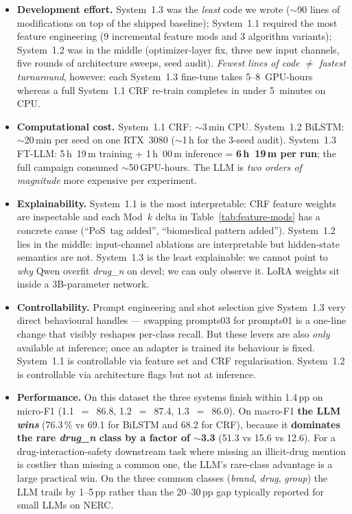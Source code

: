 \documentclass[a4paper,12pt]{article}
\begin{document}
\begin{itemize}[nosep]
    \item \textbf{Development effort.} System~1.3 was the \emph{least}
    code we wrote ($\sim$90 lines of modifications on top of the
    shipped baseline); System~1.1 required the most feature
    engineering (9 incremental feature mods and 3 algorithm
    variants); System~1.2 was in the middle (optimizer-layer fix,
    three new input channels, five rounds of architecture sweeps,
    seed audit). \emph{Fewest lines of code $\neq$ fastest turnaround},
    however: each System~1.3 fine-tune takes 5--8~GPU-hours whereas a
    full System~1.1 CRF re-train completes in under 5~minutes on
    CPU.
    \item \textbf{Computational cost.} System~1.1 CRF: $\sim$3\,min CPU.
    System~1.2 BiLSTM: $\sim$20\,min per seed on one RTX~3080
    ($\sim$1\,h for the 3-seed audit). System~1.3 FT-LLM: 5\,h~19\,m
    training + 1\,h~00\,m inference = \textbf{6\,h~19\,m per run};
    the full campaign consumed $\sim$50\,GPU-hours. The LLM is
    \emph{two orders of magnitude} more expensive per experiment.
    \item \textbf{Explainability.} System~1.1 is the most
    interpretable: CRF feature weights are inspectable and each
    Mod~$k$ delta in Table~\ref{tab:feature-mods} has a concrete
    cause (``PoS~tag added'', ``biomedical pattern added''). System~1.2
    lies in the middle: input-channel ablations are interpretable but
    hidden-state semantics are not. System~1.3 is the least
    explainable: we cannot point to \emph{why} Qwen overfit
    \textit{drug\_n} on devel; we can only observe it. LoRA weights
    sit inside a 3B-parameter network.
    \item \textbf{Controllability.} Prompt engineering and shot
    selection give System~1.3 very direct behavioural handles ---
    swapping prompts03 for prompts01 is a one-line change that
    visibly reshapes per-class recall. But these levers are also
    \emph{only} available at inference; once an adapter is trained
    its behaviour is fixed. System~1.1 is controllable via feature
    set and CRF regularisation. System~1.2 is controllable via
    architecture flags but not at inference.
    \item \textbf{Performance.} On this dataset the three systems
    finish within 1.4\,pp on micro-F1 (1.1~$=$~86.8, 1.2~$=$~87.4,
    1.3~$=$~86.0). On macro-F1 \textbf{the LLM \emph{wins}} (76.3\,\%
    vs 69.1 for BiLSTM and 68.2 for CRF), because it \textbf{dominates
    the rare \textit{drug\_n} class by a factor of $\sim$3.3} (51.3 vs
    15.6 vs 12.6). For a drug-interaction-safety downstream task where
    missing an illicit-drug mention is costlier than missing a common
    one, the LLM's rare-class advantage is a large practical win. On
    the three common classes (\textit{brand}, \textit{drug},
    \textit{group}) the LLM trails by 1--5\,pp rather than the
    20--30\,pp gap typically reported for small LLMs on NERC.
\end{itemize}
\end{document}
